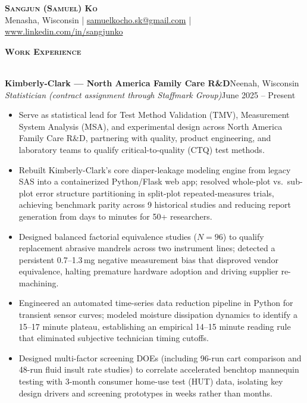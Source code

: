 \documentclass[a4paper]{article}
\newcommand{\lineunder}{
    \vspace*{-8pt} \\
    \hspace*{-18pt} \hrulefill \\
}
\newcommand{\header}[1]{
    \Needspace{4\baselineskip}
    {\hspace*{-18pt}\vspace*{6pt} \textsc{#1}}
    \vspace*{-6pt} \lineunder
}
\newcommand{\role}[4]{
    \Needspace{8\baselineskip}
    \vspace{2pt}
    \textbf{#1}\hfill #2\\
    \textit{#3}\hfill #4\\[-3pt]
}
\begin{document}
\vspace*{-40pt}

\vspace*{-10pt}
\begin{center}
    {\Huge \scshape \textbf{Sangjun (Samuel) Ko}}\\
    Menasha, Wisconsin
    | \href{mailto:samuelkocho.sk@gmail.com}{samuelkocho.sk@gmail.com}
    | \href{https://www.linkedin.com/in/sangjunko}{www.linkedin.com/in/sangjunko}
\end{center}
\vspace*{-8pt}
\header{\textbf{Work Experience}}
\vspace{1mm}
\role{Kimberly-Clark --- North America Family Care R\&D}{Neenah, Wisconsin}
{Statistician (contract assignment through Staffmark Group)}{June 2025 -- Present}
\begin{itemize}[noitemsep]
  \item Serve as statistical lead for Test Method Validation (TMV), Measurement System Analysis (MSA), and experimental design across North America Family Care R\&D, partnering with quality, product engineering, and laboratory teams to qualify critical-to-quality (CTQ) test methods.
  \item Rebuilt Kimberly-Clark's core diaper-leakage modeling engine from legacy SAS into a containerized Python/Flask web app; resolved whole-plot vs.\ sub-plot error structure partitioning in split-plot repeated-measures trials, achieving benchmark parity across 9 historical studies and reducing report generation from days to minutes for 50+ researchers.
  \item Designed balanced factorial equivalence studies ($N=96$) to qualify replacement abrasive mandrels across two instrument lines; detected a persistent 0.7--1.3\,mg negative measurement bias that disproved vendor equivalence, halting premature hardware adoption and driving supplier re-machining.
  \item Engineered an automated time-series data reduction pipeline in Python for transient sensor curves; modeled moisture dissipation dynamics to identify a 15--17 minute plateau, establishing an empirical 14--15 minute reading rule that eliminated subjective technician timing cutoffs.
  \item Designed multi-factor screening DOEs (including 96-run cart comparison and 48-run fluid insult rate studies) to correlate accelerated benchtop mannequin testing with 3-month consumer home-use test (HUT) data, isolating key design drivers and screening prototypes in weeks rather than months.

\end{itemize}
\end{document}
